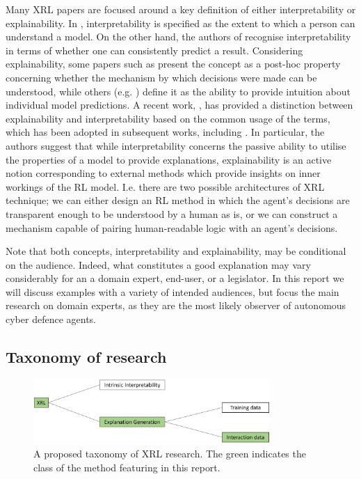 \documentclass{article}
\begin{document}
Many XRL papers are focused around a key definition of either interpretability or explainability. In \cite{miller2019explanation}, interpretability is specified as the extent to which a person can understand a model. On the other hand, the authors of \cite{kim2016examples} recognise interpretability in terms of whether one can consistently predict a result. Considering explainability, some papers such as \cite{wang2022causal} present the concept as a post-hoc property concerning whether the mechanism by which decisions were made can be understood, while others (e.g. \cite{madumal2020explainable})  define it as the ability to provide intuition about individual model predictions. A recent work, \cite{vouros2022explainable}, has provided a distinction between explainability and interpretability based on the common usage of the terms, which has been adopted in subsequent works, including \cite{glanois2021survey}. In particular, the authors suggest that while interpretability concerns the passive ability to utilise the properties of a model to provide explanations, explainability is an active notion corresponding to external methods which provide insights on inner workings of the RL model. I.e. there are two possible architectures of XRL technique; we can either design an RL method in which the agent's decisions are transparent enough to be understood by a human as is, or we can construct a mechanism capable of pairing human-readable logic with an agent's decisions. 

Note that both concepts, interpretability and explainability, may be conditional on the audience. Indeed, what constitutes a good explanation may vary considerably for an  a domain expert, end-user, or a legislator. In this report we will discuss examples with a variety of intended audiences, but focus the main research on domain experts, as they are the most likely observer of autonomous cyber defence agents. 


\subsection{Taxonomy of research}

\begin{figure}[htp]
    \centering
    \includegraphics[width=0.8\textwidth]{Images/XRL taxonomy.png}
    \caption{A proposed taxonomy of XRL research. The green indicates the class of the method featuring in this report.}
    \label{fig:xrl_taxonomy}
\end{figure}
\end{document}

